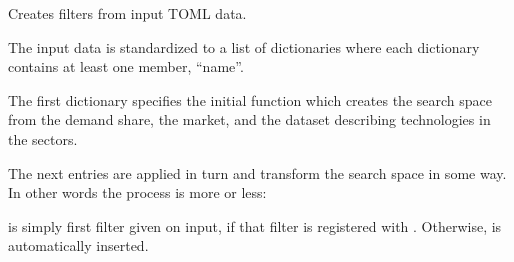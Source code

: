 \documentclass[letterpaper,10pt,english]{sphinxmanual}
\begin{document}
\begin{fulllineitems}
\label{\detokenize{api:muse.filters.factory}}
Creates filters from input TOML data.

The input data is standardized to a list of dictionaries where each dictionary
contains at least one member, “name”.

The first dictionary specifies the initial function which creates the search space
from the demand share, the market, and the dataset describing technologies in the
sectors.

The next entries are applied in turn and transform the search space in some way.
In other words the process is more or less:

\begin{sphinxVerbatim}[commandchars=\\\{\}]
  
       
   
      
           
 
\end{sphinxVerbatim}

 is simply first filter given on input, if that filter is
registered with . Otherwise,
 is automatically inserted.

\end{fulllineitems}

\end{document}
